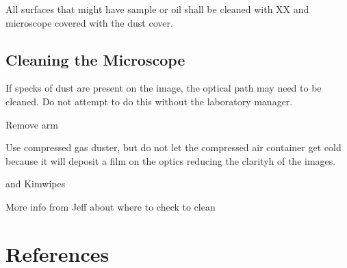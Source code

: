 \documentclass[12pt]{../SOP2}
\begin{document}
\NP All surfaces that might have sample or oil shall be cleaned with XX and microscope covered with the dust cover. 

\subsection*{Cleaning the Microscope}

\NP If specks of dust are present on the image, the optical path may need to be cleaned. Do not attempt to do this without the laboratory manager.

\NP Remove arm

\NP Use compressed gas duster, but do not let the compressed air container get cold because it will deposit a film on the optics reducing the clarityh of the images.

\NP and Kimwipes

\NP More info from Jeff about where to check to clean

\section{References}
\end{document}
